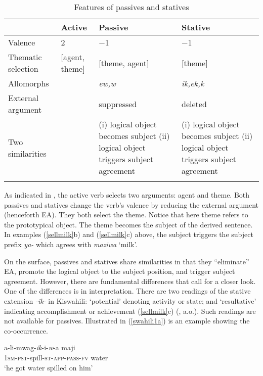 \documentclass[output=paper]{langscibook}
\begin{document}
\begin{table}
\begin{tabularx}{\textwidth}{l QQQ}
 \lsptoprule
  & Active & Passive & Stative\\
\midrule
 Valence & 2 & −1 & −1\\
  Thematic selection & [agent, theme]  & [theme, agent] & [theme]\\
 Allomorphs   &   &\textit{ew,w} & \textit{ik,ek,k}\\
 External argument &  & suppressed & deleted\\
 Two similarities   &  & (i) logical object becomes subject   (ii) logical object triggers subject agreement & (i) logical object becomes subject   (ii) logical object triggers subject agreement\\
  \lspbottomrule
 \end{tabularx}
    \caption{Features of passives and statives\label{con_ngo:table1}}
\end{table}

As indicated in , the active verb selects two arguments: agent and theme. Both passives and statives change the verb's valence by reducing the external argument (henceforth EA). They both select the theme. Notice that here theme refers to the prototypical object. The theme becomes the subject of the derived sentence. In examples (\ref{sellmilk}b) and (\ref{sellmilk}c) above, the subject triggers the subject prefix \textit{ya-} which agrees with \textit{maziwa} `milk’.  

On the surface, passives and statives share similarities in that they “eliminate” EA, promote the logical object to the subject position, and trigger subject agreement. However, there are fundamental differences that call for a closer look. One of the differences is in interpretation. There are two readings of the stative extension \textit{-ik-} in Kiswahili: `potential’ denoting activity or state; and `resultative’ indicating accomplishment or achievement (\ref{sellmilk}c) (\citealt{Simango:2009aa,Levin:1993aa,vendler67}, a.o.). Such readings are not available for passives. Illustrated in (\ref{swahili1a}) is an example showing the co-occurrence.

\begin{exe}
\ex\label{swahili1a}
\gll a-li-mwag-\textit{ik}-i-\textit{w}-a   maji\\
\textsc{1sm-pst}-spill-\textsc{st-app-pass-fv}  water\\
\glt `he got water spilled on him'
\end{exe}
\end{document}
